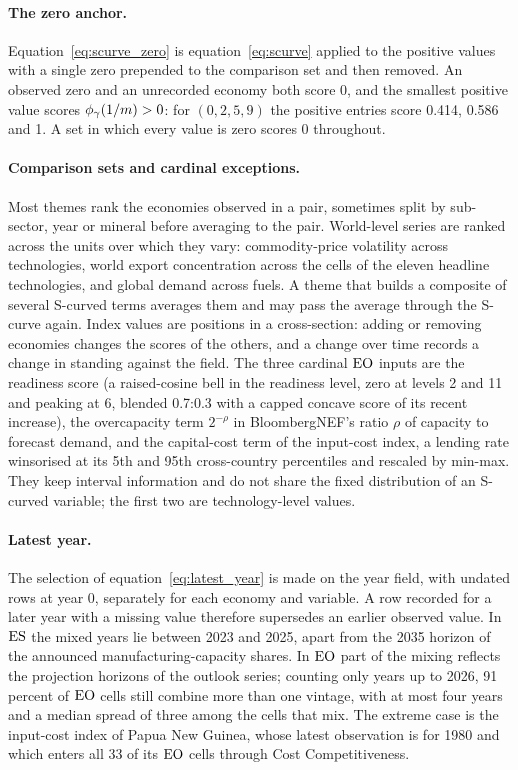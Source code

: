 \paragraph{The zero anchor.} Equation~\eqref{eq:scurve_zero} is equation~\eqref{eq:scurve}
applied to the positive values with a single zero prepended to the comparison set and then
removed. An observed zero and an unrecorded economy both score 0, and the smallest positive value
scores $\phi_{\gamma}(1/m)>0$: for $(0,2,5,9)$ the positive entries score 0.414, 0.586 and 1. A set in
which every value is zero scores 0 throughout.

\paragraph{Comparison sets and cardinal exceptions.} Most themes rank the economies observed in a
pair, sometimes split by sub-sector, year or mineral before averaging to the pair. World-level
series are ranked across the units over which they vary: commodity-price volatility across
technologies, world export concentration across the cells of the eleven headline technologies, and
global demand across fuels. A theme that builds a composite of several S-curved terms averages
them and may pass the average through the S-curve again. Index values are positions in a
cross-section: adding or removing economies changes the scores of the others, and a change over
time records a change in standing against the field. The three cardinal $\mathrm{EO}$ inputs are the
readiness score (a raised-cosine bell in the readiness level, zero at levels 2 and 11 and peaking
at 6, blended 0.7:0.3 with a capped concave score of its recent increase), the overcapacity term
$2^{-\rho}$ in BloombergNEF's ratio $\rho$ of capacity to forecast demand, and the capital-cost
term of the input-cost index, a lending rate winsorised at its 5th and 95th cross-country
percentiles and rescaled by min-max. They keep interval information and do not share the fixed
distribution of an S-curved variable; the first two are technology-level values.

\paragraph{Latest year.} The selection of equation~\eqref{eq:latest_year} is made on the year
field, with undated rows at year 0, separately for each economy and variable. A row recorded for a
later year with a missing value therefore supersedes an earlier observed value. In $\mathrm{ES}$ the mixed
years lie between 2023 and 2025, apart from the 2035 horizon of the announced manufacturing-capacity
shares. In $\mathrm{EO}$ part of the mixing reflects the projection horizons of the outlook series;
counting only years up to 2026, 91 percent of $\mathrm{EO}$ cells still combine more than one vintage, with
at most four years and a median spread of three among the cells that mix. The extreme case is the
input-cost index of Papua New Guinea, whose latest observation is for 1980 and which enters all 33
of its $\mathrm{EO}$ cells through Cost Competitiveness.


